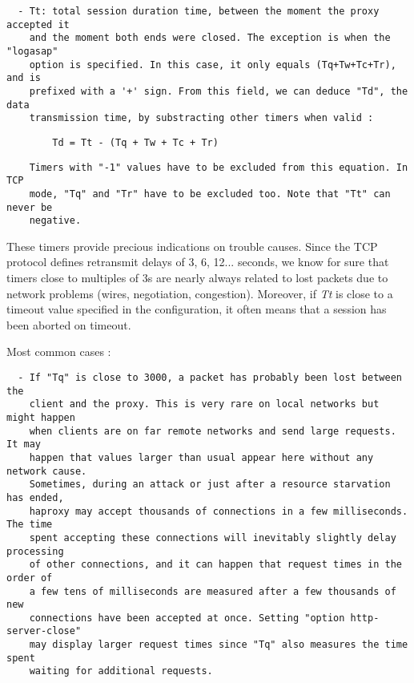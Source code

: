 \begin{verbatim}
  - Tt: total session duration time, between the moment the proxy accepted it
    and the moment both ends were closed. The exception is when the "logasap"
    option is specified. In this case, it only equals (Tq+Tw+Tc+Tr), and is
    prefixed with a '+' sign. From this field, we can deduce "Td", the data
    transmission time, by substracting other timers when valid :
\end{verbatim}

\begin{verbatim}
        Td = Tt - (Tq + Tw + Tc + Tr)
\end{verbatim}

\begin{verbatim}
    Timers with "-1" values have to be excluded from this equation. In TCP
    mode, "Tq" and "Tr" have to be excluded too. Note that "Tt" can never be
    negative.
\end{verbatim}


These timers provide precious indications on trouble causes. Since the TCP
protocol defines retransmit delays of 3, 6, 12... seconds, we know for sure
that timers close to multiples of 3s are nearly always related to lost packets
due to network problems (wires, negotiation, congestion). Moreover, if \emph{Tt} is
close to a timeout value specified in the configuration, it often means that a
session has been aborted on timeout.


Most common cases :

\begin{verbatim}
  - If "Tq" is close to 3000, a packet has probably been lost between the
    client and the proxy. This is very rare on local networks but might happen
    when clients are on far remote networks and send large requests. It may
    happen that values larger than usual appear here without any network cause.
    Sometimes, during an attack or just after a resource starvation has ended,
    haproxy may accept thousands of connections in a few milliseconds. The time
    spent accepting these connections will inevitably slightly delay processing
    of other connections, and it can happen that request times in the order of
    a few tens of milliseconds are measured after a few thousands of new
    connections have been accepted at once. Setting "option http-server-close"
    may display larger request times since "Tq" also measures the time spent
    waiting for additional requests.
\end{verbatim}

